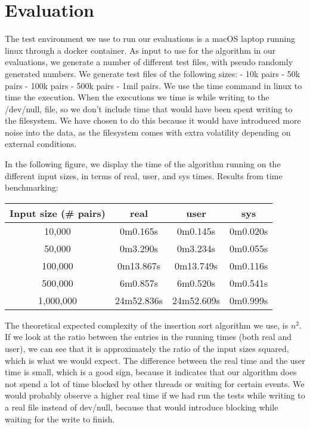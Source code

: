 \documentclass{article}
\begin{document}
\section{Evaluation}
The test environment we use to run our evaluations is a macOS laptop running linux through a docker container.
As input to use for the algorithm in our evaluations, we generate a number of different test files, with pseudo randomly generated numbers. We generate test files of the following sizes:\newline
- 10k pairs \newline
- 50k pairs \newline
- 100k pairs \newline
- 500k pairs \newline
- 1mil pairs. \newline
\newline
We use the time command in linux to time the execution.
When the executions we time is while writing to the /dev/null, file, so we don't include time that would have been spent writing to the filesystem.
We have chosen to do this because it would have introduced more noise into the data, as the filesystem comes with extra volatility depending on external conditions.

In the following figure, we display the time of the algorithm running on the different input sizes, in terms of real, user, and sys times.
Results from time benchmarking:
\begin{center}
\begin{tabular}{||c c c c ||} 
 \hline
 Input size (\# pairs) & real & user & sys\\ [0.5ex] 
 \hline\hline
 10,000 & 0m0.165s & 0m0.145s & 0m0.020s  \\ 
 \hline
 50,000 & 0m3.290s & 0m3.234s & 0m0.055s  \\
 \hline
 100,000 & 0m13.867s & 0m13.749s & 0m0.116s \\
 \hline
 500,000 & 6m0.857s & 	6m0.520s & 0m0.541s \\
 \hline
 1,000,000 & 24m52.836s & 24m52.609s & 0m0.999s \\ [1ex] 
 \hline
\end{tabular}
\end{center}
The theoretical expected complexity of the insertion sort algorithm we use, is $n^2$.
If we look at the ratio between the entries in the running times (both real and user), we can see that it is approximately the ratio of the input sizes squared, which is what we would expect. The difference between the real time and the user time is small, which is a good sign, because it indicates that our algorithm does not spend a lot of time blocked by other threads or waiting for certain events. We would probably observe a higher real time if we had run the tests while writing to a real file instead of dev/null, because that would introduce blocking while waiting for the write to finish.
\end{document}
